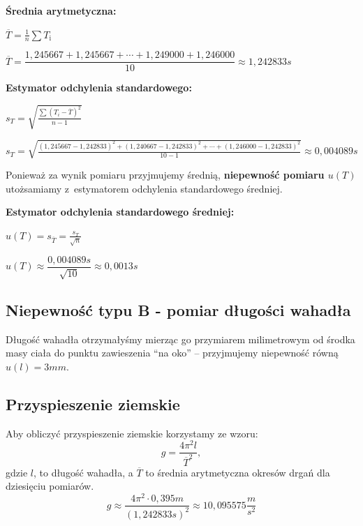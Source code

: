 \documentclass[a4paper,11pt]{article}
\begin{document}
\begin{center}
\textbf{Średnia arytmetyczna:}
\end{center}
\begin{center}
$\overline{T}=\frac{1}{n}\sum T_{\mathrm{i}}$ 
\end{center}
\begin{center} 
$\overline{T}=\dfrac{1,245667+1,245667+\cdots+1,249000+1,246000}{10}\approx1,242833s$   
\end{center}
\break
\begin{center}
\textbf{Estymator odchylenia standardowego:}
\end{center}
\begin{center}
$s_{T}=\sqrt{\frac{\sum(T_{i}-\overline{T})^{2}}{n-1}}$
\end{center}
\begin{center}
$s_{T}=\sqrt{\frac{(1,245667-1,242833)^{2}+(1,240667-1,242833)^{2}+\cdots+(1,246000-1,242833)^{2}}{10-1}}\approx0,004089s$
\end{center}
Ponieważ za wynik pomiaru przyjmujemy średnią, \textbf{niepewność pomiaru $u(T)$} utożsamiamy z~estymatorem odchylenia standardowego średniej.
\begin{center}
\textbf{Estymator odchylenia standardowego średniej:}
\end{center}
\begin{center}
$u(T)=s_{\overline{T}}=\displaystyle \frac{s_{T}}{\sqrt{n}}$
\end{center}
\begin{center}
$u(T)\approx\dfrac{0,004089s}{\sqrt{10}}\approx0,0013s$  
\end{center}

\subsection{Niepewność typu B - pomiar długości wahadła}
Długość wahadła otrzymałyśmy mierząc go przymiarem milimetrowym od środka masy ciała do punktu zawieszenia ``na oko'' -- przyjmujemy niepewność równą $u(l)=3mm$. 

\subsection{Przyspieszenie ziemskie}
Aby obliczyć przyspieszenie ziemskie korzystamy ze wzoru:
$$g=\frac{4\pi^{2}l}{\overline{T}^{2}},$$
gdzie $l$, to długość wahadła, a $\overline{T}$ to średnia arytmetyczna okresów drgań dla dziesięciu pomiarów.
$$g\approx\frac{4\pi^{2}\cdot0,395m}{(1,242833s)^{2}}\approx10,095575\dfrac{m}{s^{2}}$$
\end{document}
